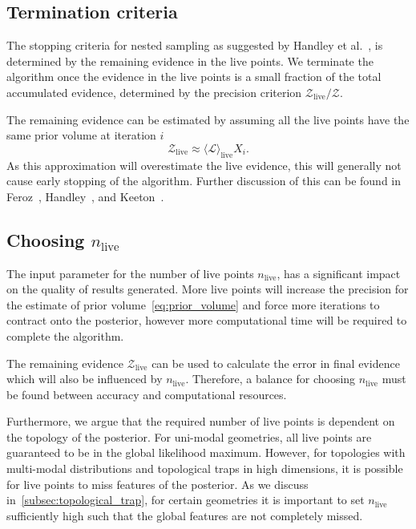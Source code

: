 \documentclass[11pt]{article}
\begin{document}
    \subsection{Termination criteria}\label{subsec:termination_criteria}
    The stopping criteria for nested sampling as suggested by Handley et al.~\cite{Handley_2015}, is determined by
    the remaining evidence in the live points.
    We terminate the algorithm once the evidence in the live points is a small fraction of the total accumulated evidence,
    determined by the precision criterion $\mathcal{Z}_{\text{live}} / \mathcal{Z}$.

    The remaining evidence can be estimated by assuming all the live points have the same prior volume at iteration $i$
    \begin{equation}\label{eq:remaining_evidence}
    \mathcal{Z}_{\text{live}} \approx \langle \mathcal{L} \rangle_{\text{live}} X_i.
    \end{equation}
    As this approximation will overestimate the live evidence, this will generally not cause early stopping of the algorithm.
    Further discussion of this can be found in Feroz~\cite{Feroz_2009}, Handley~\cite{Handley_2015}, and
    Keeton~\cite{keeton2011statistical}.

    \subsection{Choosing $n_{\text{live}}$}\label{subsec:ns_termination}
    The input parameter for the number of live points $n_{\text{live}}$, has a significant impact on the quality of results generated.
    More live points will increase the precision for the estimate of prior volume~\eqref{eq:prior_volume} and force more
    iterations to contract onto the posterior, however more computational time will be required to complete the algorithm.

    The remaining evidence $\mathcal{Z}_{\text{live}}$ can be used to calculate the error in final
    evidence~\cite{keeton2011statistical, Handley_2015} which will also be influenced by $n_{\text{live}}$.
    Therefore, a balance for choosing $n_{\text{live}}$ must be found between accuracy and computational resources.

    Furthermore, we argue that the required number of live points is dependent on the topology of the posterior.
    For uni-modal geometries, all live points are guaranteed to be in the global likelihood maximum.
    However, for topologies with multi-modal distributions and topological traps in high dimensions,
    it is possible for live points to miss features of the posterior.
    As we discuss in~\ref{subsec:topological_trap}, for certain geometries it is important to
    set $n_{\text{live}}$ sufficiently high such that the global features are not completely missed.
\end{document}
